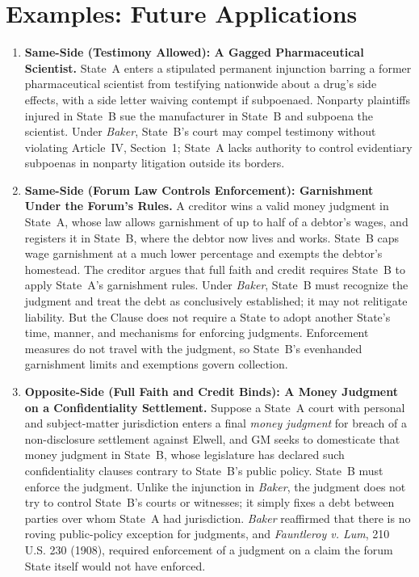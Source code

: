 \documentclass[12pt]{article}
\begin{document}
\section{Examples: Future Applications}
\begin{enumerate}

\item \textbf{Same-Side (Testimony Allowed): A Gagged Pharmaceutical Scientist.} State~A enters a stipulated permanent injunction barring a former pharmaceutical scientist from testifying nationwide about a drug's side effects, with a side letter waiving contempt if subpoenaed. Nonparty plaintiffs injured in State~B sue the manufacturer in State~B and subpoena the scientist. Under \textit{Baker}, State~B's court may compel testimony without violating Article~IV, Section~1; State~A lacks authority to control evidentiary subpoenas in nonparty litigation outside its borders.

\item \textbf{Same-Side (Forum Law Controls Enforcement): Garnishment Under the Forum's Rules.} A creditor wins a valid money judgment in State~A, whose law allows garnishment of up to half of a debtor's wages, and registers it in State~B, where the debtor now lives and works. State~B caps wage garnishment at a much lower percentage and exempts the debtor's homestead. The creditor argues that full faith and credit requires State~B to apply State~A's garnishment rules. Under \textit{Baker}, State~B must recognize the judgment and treat the debt as conclusively established; it may not relitigate liability. But the Clause does not require a State to adopt another State's time, manner, and mechanisms for enforcing judgments. Enforcement measures do not travel with the judgment, so State~B's evenhanded garnishment limits and exemptions govern collection.

\item \textbf{Opposite-Side (Full Faith and Credit Binds): A Money Judgment on a Confidentiality Settlement.} Suppose a State~A court with personal and subject-matter jurisdiction enters a final \textit{money judgment} for breach of a non-disclosure settlement against Elwell, and GM seeks to domesticate that money judgment in State~B, whose legislature has declared such confidentiality clauses contrary to State~B's public policy. State~B must enforce the judgment. Unlike the injunction in \textit{Baker}, the judgment does not try to control State~B's courts or witnesses; it simply fixes a debt between parties over whom State~A had jurisdiction. \textit{Baker} reaffirmed that there is no roving public-policy exception for judgments, and \textit{Fauntleroy v. Lum}, 210 U.S. 230 (1908), required enforcement of a judgment on a claim the forum State itself would not have enforced.


\end{enumerate}
\end{document}

